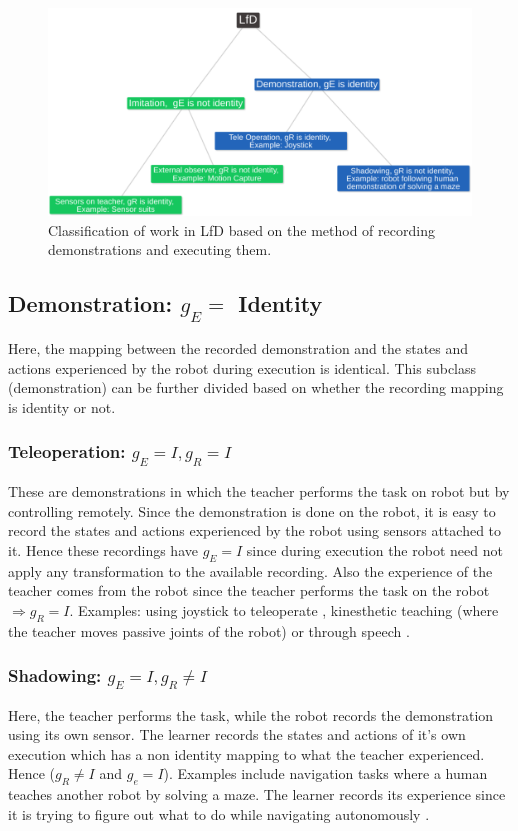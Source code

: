 \documentclass{article}[11pt]
\begin{document}
\begin{figure}[H]
  \begin{center}
    \includegraphics[width=1\linewidth]{images/classification}
    \caption{Classification of work in LfD based on the method of recording demonstrations and executing them.}
    \label{fig:class}
  \end{center}
\end{figure}


\subsection{Demonstration: $g_E = $ Identity}
	Here, the mapping between the recorded demonstration and the states and actions experienced by the robot during execution is identical. This subclass (demonstration) can be further divided based on whether the recording mapping is identity or not. 

\subsubsection{Teleoperation: $g_E = I, g_R = I$}
These are demonstrations in which the teacher performs the task on robot but by controlling remotely. Since the demonstration is done on the robot, it is easy to record the states and actions experienced by the robot using sensors attached to it. Hence these recordings have $g_E = I$ since during execution the robot need not apply any transformation to the available recording. Also the experience of the teacher comes from the robot since the teacher performs the task on the robot $\Rightarrow g_R = I$. Examples: using joystick to teleoperate \cite{invheli}, kinesthetic teaching \cite{fbm} (where the teacher moves passive joints of the robot) or through speech \cite{speech}. 

\subsubsection{Shadowing: $g_E = I, g_R \neq I$}
Here, the teacher performs the task, while the robot records the demonstration using its own sensor. The learner records the states and actions of it's own execution which has a non identity mapping to what the teacher experienced. Hence ($g_R \neq I$ and $g_e = I$). Examples include navigation tasks where a human teaches another robot by solving a maze. The learner records its experience since it is trying to figure out what to do while navigating autonomously \cite{shad}.
\end{document}
